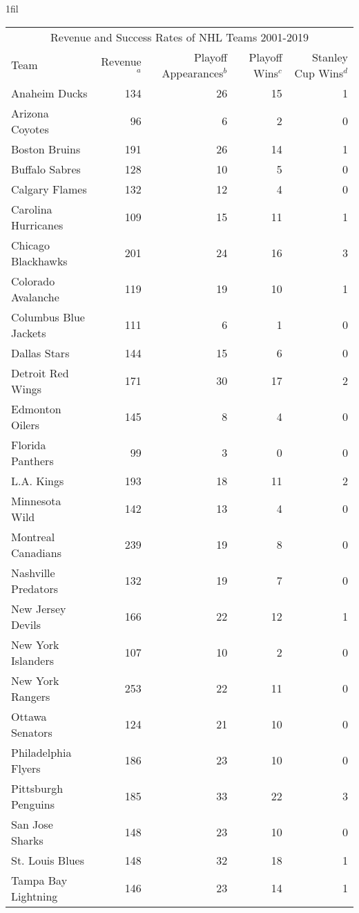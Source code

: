 \documentclass[11pt]{report}            %
\makeatletter
\newcommand*{\centerfloat}{%
  \parindent \z@
  \leftskip \z@ \@plus 1fil \@minus \textwidth
  \rightskip\leftskip
  \parfillskip \z@skip}
\makeatother
\begin{document}
\begin{table}[ht]
\centerfloat
\begin{tabular}{lrrrr}
\hline
\multicolumn{5}{c}{Revenue and Success Rates of NHL Teams 2001-2019} \\
Team & Revenue$^a$ & Playoff Appearances$^b$ & Playoff Wins$^c$ & Stanley Cup Wins$^d$ \\ 
\hline
Anaheim Ducks & 134 &  26 &  15 &   1 \\ 
Arizona Coyotes &  96 &   6 &   2 &   0 \\ 
Boston Bruins & 191 &  26 &  14 &   1 \\ 
Buffalo Sabres & 128 &  10 &   5 &   0 \\ 
Calgary Flames & 132 &  12 &   4 &   0 \\ 
Carolina Hurricanes & 109 &  15 &  11 &   1 \\ 
Chicago Blackhawks & 201 &  24 &  16 &   3 \\ 
Colorado Avalanche & 119 &  19 &  10 &   1 \\ 
Columbus Blue Jackets & 111 &   6 &   1 &   0 \\ 
Dallas Stars & 144 &  15 &   6 &   0 \\ 
Detroit Red Wings & 171 &  30 &  17 &   2 \\ 
Edmonton Oilers & 145 &   8 &   4 &   0 \\ 
Florida Panthers &  99 &   3 &   0 &   0 \\ 
L.A. Kings & 193 &  18 &  11 &   2 \\ 
Minnesota Wild & 142 &  13 &   4 &   0 \\ 
Montreal Canadians & 239 &  19 &   8 &   0 \\ 
Nashville Predators & 132 &  19 &   7 &   0 \\ 
New Jersey Devils & 166 &  22 &  12 &   1 \\ 
New York Islanders & 107 &  10 &   2 &   0 \\ 
New York Rangers & 253 &  22 &  11 &   0 \\ 
Ottawa Senators & 124 &  21 &  10 &   0 \\ 
Philadelphia Flyers & 186 &  23 &  10 &   0 \\ 
Pittsburgh Penguins & 185 &  33 &  22 &   3 \\ 
San Jose Sharks & 148 &  23 &  10 &   0 \\ 
St. Louis Blues & 148 &  32 &  18 &   1 \\ 
Tampa Bay Lightning & 146 &  23 &  14 &   1 \\ 

\end{tabular}
\end{table}
\end{document}
